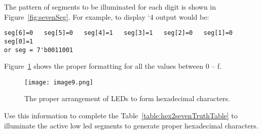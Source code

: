 The pattern of segments to be illuminated for each digit is shown in
Figure~\ref{fig:sevenSeg}. For example, to display `4 output would be:

\begin{verbatim}
seg[6]=0   seg[5]=0   seg[4]=1   seg[3]=1   seg[2]=0   seg[1]=0   seg[0]=1
or seg = 7'b0011001
\end{verbatim}

Figure~\ref{fig:sevenSegChars} shows the proper formatting for all the values between 0 -- f.

\begin{figure}[ht]
    \texttt{[image: image9.png]}
    \caption{The proper arrangement of LEDs to form hexadecimal characters.}
    \label{fig:sevenSegChars}
\end{figure}

Use this information to
complete the Table~\ref{table:hex2sevenTruthTable} to illuminate the active low led segments
to generate proper hexadecimal characters.

